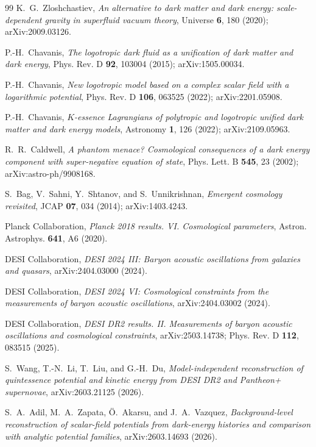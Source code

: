 \documentclass[11pt,reqno]{amsart}
\theoremstyle{plain}
\theoremstyle{definition}
\theoremstyle{remark}
\begin{document}
\begin{thebibliography}{99}
K.~G.~Zloshchastiev,
\emph{An alternative to dark matter and dark energy: scale-dependent gravity
in superfluid vacuum theory},
Universe \textbf{6}, 180 (2020); arXiv:2009.03126.

P.-H.~Chavanis,
\emph{The logotropic dark fluid as a unification of dark matter and dark energy},
Phys. Rev. D \textbf{92}, 103004 (2015); arXiv:1505.00034.

P.-H.~Chavanis,
\emph{New logotropic model based on a complex scalar field with a logarithmic potential},
Phys. Rev. D \textbf{106}, 063525 (2022); arXiv:2201.05908.

P.-H.~Chavanis,
\emph{$K$-essence Lagrangians of polytropic and logotropic unified
dark matter and dark energy models},
Astronomy \textbf{1}, 126 (2022); arXiv:2109.05963.

R.~R.~Caldwell,
\emph{A phantom menace? Cosmological consequences of a dark energy
component with super-negative equation of state},
Phys. Lett. B \textbf{545}, 23 (2002); arXiv:astro-ph/9908168.

S.~Bag, V.~Sahni, Y.~Shtanov, and S.~Unnikrishnan,
\emph{Emergent cosmology revisited},
JCAP \textbf{07}, 034 (2014); arXiv:1403.4243.

Planck Collaboration,
\emph{Planck 2018 results. VI. Cosmological parameters},
Astron. Astrophys. \textbf{641}, A6 (2020).

DESI Collaboration,
\emph{DESI 2024 III: Baryon acoustic oscillations from galaxies and quasars},
arXiv:2404.03000 (2024).

DESI Collaboration,
\emph{DESI 2024 VI: Cosmological constraints from the measurements of baryon acoustic oscillations},
arXiv:2404.03002 (2024).

DESI Collaboration,
\emph{DESI DR2 results. II. Measurements of baryon acoustic oscillations and cosmological constraints},
arXiv:2503.14738; Phys. Rev. D \textbf{112}, 083515 (2025).

S.~Wang, T.-N.~Li, T.~Liu, and G.-H.~Du,
\emph{Model-independent reconstruction of quintessence potential and kinetic energy from DESI DR2 and Pantheon+ supernovae},
arXiv:2603.21125 (2026).

S.~A.~Adil, M.~A.~Zapata, \"{O}.~Akarsu, and J.~A.~Vazquez,
\emph{Background-level reconstruction of scalar-field potentials from dark-energy histories and comparison with analytic potential families},
arXiv:2603.14693 (2026).


\end{thebibliography}
\end{document}
